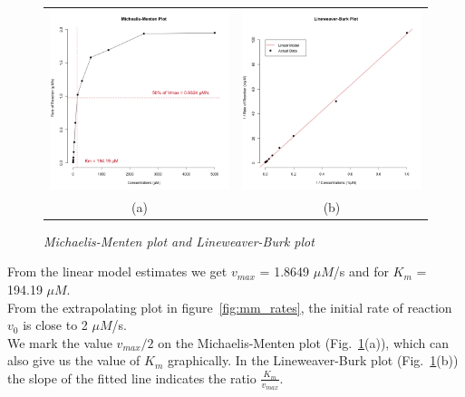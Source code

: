 \documentclass[a4paper,10pt]{article}
\begin{document}
                \begin{figure}[H]
                    \centering
                    \begin{tabular}{cc}
                        \includegraphics[width=220px]{../resources/kinetics_mmplot.png} &
                        \includegraphics[width=220px]{../resources/kinetics_lbplot.png} \\
                        (a) & (b)\\
                    \end{tabular}
                    \caption{\it Michaelis-Menten plot and Lineweaver-Burk plot}\label{fig:mm_plot}
                \end{figure}

                \noindent From the linear model estimates we get $v_{max}$ = 1.8649 $\mu M$/s and for $K_m$ = 194.19 $\mu M$.\\
                From the extrapolating plot in figure~\ref{fig:mm_rates}, the initial rate of reaction $v_0$ is close to 2 $\mu M$/s.\\

                We mark the value $v_{max}/2$ on the Michaelis-Menten plot (Fig.~\ref{fig:mm_plot}(a)), which can
                also give us the value of $K_m$ graphically. 
                In the Lineweaver-Burk plot (Fig.~\ref{fig:mm_plot}(b)) the slope of the fitted line indicates 
                the ratio $\frac{K_m}{v_{max}}$.\\
\end{document}
